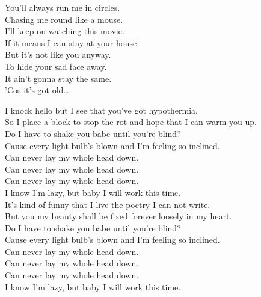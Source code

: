 You'll always run me in circles. \\
Chasing me round like a mouse. \\
I'll keep on watching this movie. \\
If it means I can stay at your house. \\
But it's not like you anyway. \\
To hide your sad face away. \\
It ain't gonna stay the same. \\
'Cos it's got old… \\





I knock hello but I see that you've got hypothermia. \\
So I place a block to stop the rot and hope that I can warm you up. \\
Do I have to shake you babe until you're blind? \\
Cause every light bulb's blown and I'm feeling so inclined. \\

Can never lay my whole head down. \\
Can never lay my whole head down. \\
Can never lay my whole head down. \\
I know I'm lazy, but baby I will work this time. \\

It's kind of funny that I live the poetry I can not write. \\
But you my beauty shall be fixed forever loosely in my heart. \\
Do I have to shake you babe until you're blind? \\
Cause every light bulb's blown and I'm feeling so inclined. \\

Can never lay my whole head down. \\
Can never lay my whole head down. \\
Can never lay my whole head down. \\
I know I'm lazy, but baby I will work this time. \\


